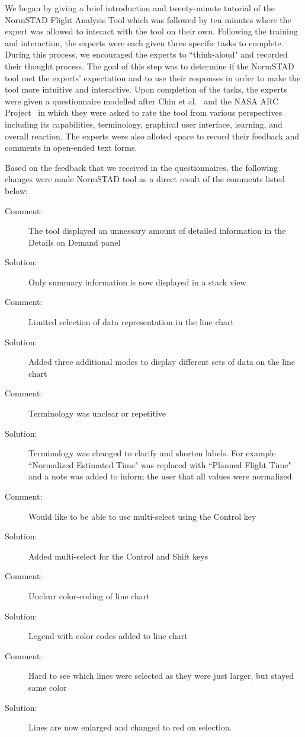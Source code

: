 \documentclass{sig-alternate}
\begin{document}
We began by giving a brief introduction and twenty-minute
tutorial of the NormSTAD Flight Analysis Tool which was followed by ten minutes where
the expert was allowed to interact with the tool on their own. Following the training
and interaction, the experts were each given three specific tasks to complete. 
During this process, we encouraged the experts to ``think-aloud" and recorded their 
thought process. The goal of this step was to determine if the NormSTAD tool met
the experts' expectation and to use their responses in order to make the tool
more intuitive and interactive. Upon completion of the tasks, the experts were
given a questionnaire modelled after Chin et al.~\cite{Chin88} and the 
NASA ARC Project~\cite{NASA}
 in which they were asked to rate the tool from various perspectives
including its capabilities, terminology, graphical user interface, learning, and
overall reaction. The experts were also alloted space to record their feedback
and comments in open-ended text forms.

Based on the feedback that we received in the questionnaires, the following changes
were made NormSTAD tool as a direct result of the comments listed below:
\begin{description}
	\item[Comment: ] The tool displayed an unnessary amount of detailed information
in the Details on Demand panel
	\item[Solution: ] Only summary information is now displayed in a stack view
	\item[Comment: ] Limited selection of data representation in the line chart
	\item[Solution: ] Added three additional modes to display different sets of data
on the line chart
	\item[Comment: ] Terminology was unclear or repetitive
	\item[Solution: ] Terminology was changed to clarify and shorten labels. For example
``Normalized Estimated Time" was replaced with ``Planned Flight Time" and a note was
added to inform the user that all values were normalized
	\item[Comment: ] Would like to be able to use multi-select using the Control key
	\item[Solution: ] Added multi-select for the Control and Shift keys
	\item[Comment: ] Unclear color-coding of line chart
	\item[Solution: ] Legend with color codes added to line chart
	\item[Comment: ] Hard to see which lines were selected as they were just larger, but
stayed same color
	\item[Solution: ] Lines are now enlarged and changed to red on selection.
\end{description}
\end{document}
